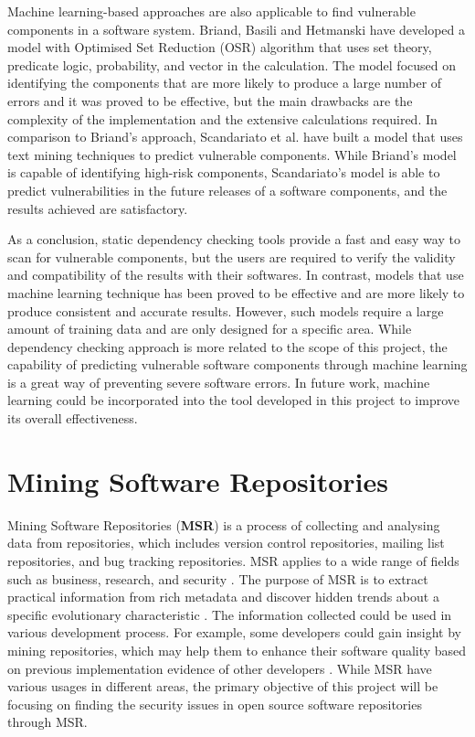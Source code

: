 \documentclass[12pt, a4paper]{report}
\begin{document}
Machine learning-based approaches are also applicable to find vulnerable components in a software
system. Briand, Basili and Hetmanski \cite{briand_1993} have developed a model with Optimised Set
Reduction (OSR) algorithm that uses set theory, predicate logic, probability, and vector in the
calculation. The model focused on identifying the components that are more likely to produce a large
number of errors and it was proved to be effective, but the main drawbacks are the complexity of the
implementation and the extensive calculations required. In comparison to Briand's approach,
Scandariato et al. \cite{scandariato_2014} have built a model that uses text mining techniques to
predict vulnerable components. While Briand's model is capable of identifying high-risk components,
Scandariato's model is able to predict vulnerabilities in the future releases of a software
components, and the results achieved are satisfactory.

As a conclusion, static dependency checking tools provide a fast and easy way to scan for vulnerable
components, but the users are required to verify the validity and compatibility of the results with
their softwares. In contrast, models that use machine learning technique has been proved to be
effective and are more likely to produce consistent and accurate results. However, such models
require a large amount of training data and are only designed for a specific area. While dependency
checking approach is more related to the scope of this project, the capability of predicting
vulnerable software components through machine learning is a great way of preventing severe software
errors. In future work, machine learning could be incorporated into the tool developed in this
project to improve its overall effectiveness.

\section{Mining Software Repositories}
Mining Software Repositories (\textbf{MSR}) is a process of collecting and analysing data from
repositories, which includes version control repositories, mailing list repositories, and bug
tracking repositories. MSR applies to a wide range of fields such as business, research, and
security \cite{poncin_2011}. The purpose of MSR is to extract practical information from rich
metadata and discover hidden trends about a specific evolutionary characteristic \cite{kagdi_2007}.
The information collected could be used in various development process. For example, some developers
could gain insight by mining repositories, which may help them to enhance their software quality
based on previous implementation evidence of other developers \cite{hassan_2008}. While MSR have
various usages in different areas, the primary objective of this project will be focusing on finding
the security issues in open source software repositories through MSR.
\end{document}
